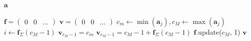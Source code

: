 \begin{algorithm}[htbp]
\begin{algorithmic}[1]
\Require $\bm{a}$ 

\State $\bm{f} = \begin{pmatrix}
    0 & 0 & ...
\end{pmatrix}$ 
\State $\bm{v} = \begin{pmatrix}
    0 & 0 & ...
\end{pmatrix}$ 
    \State $c_m \gets \min(\bm{a}_j), c_M \gets \max(\bm{a}_j)$
    \State $i \gets \bm{f}_\Sigma(c_M-1)$ 
        \State $\bm{v}_{c_M-1} = c_m$ 
    \Else
        \State $\bm{v}_{c_M-1} = c_M - 1 + \bm{f}_\Sigma(c_M-1)$ 
    \EndIf
    \State $\bm{f}$.update($c_M$, 1) 
\EndFor
\State \Return $\bm{v}$
\end{algorithmic}
\caption{Build a phylo2vec vector from an ordered ancestry.}
\label{alg:buildvector}
\end{algorithm}